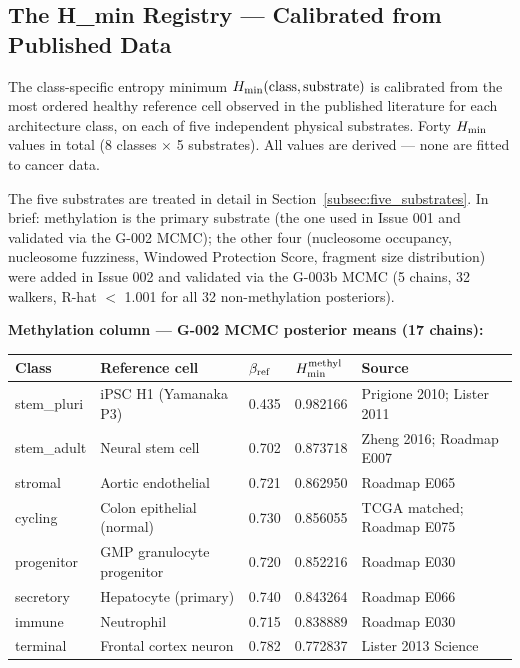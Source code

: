 \documentclass[12pt,a4paper]{article}
\begin{document}

\subsection{The H\_min Registry --- Calibrated from Published Data}
\label{subsec:hmin}

The class-specific entropy minimum $H_{\rm min}(\text{class},\text{substrate})$ is
calibrated from the most ordered healthy reference cell observed in the published
literature for each architecture class, on each of five independent physical
substrates. Forty $H_{\rm min}$ values in total (8 classes $\times$ 5 substrates).
All values are derived --- none are fitted to cancer data.

The five substrates are treated in detail in Section~\ref{subsec:five_substrates}.
In brief: methylation is the primary substrate (the one used in Issue 001 and
validated via the G-002 MCMC); the other four (nucleosome occupancy, nucleosome
fuzziness, Windowed Protection Score, fragment size distribution) were added in
Issue 002 and validated via the G-003b MCMC (5 chains, 32 walkers, R-hat $<$ 1.001
for all 32 non-methylation posteriors).

\textbf{Methylation column --- G-002 MCMC posterior means (17 chains):}

\begin{center}
\renewcommand{\arraystretch}{1.25}
\begin{tabular}{llllp{3.8cm}}
\toprule
\textbf{Class} & \textbf{Reference cell} & \textbf{$\beta_{\rm ref}$} &
\textbf{$H_{\rm min}^{\rm methyl}$} & \textbf{Source} \\
\midrule
stem\_pluri & iPSC H1 (Yamanaka P3) & 0.435 & 0.982166 & Prigione 2010; Lister 2011 \\
stem\_adult & Neural stem cell       & 0.702 & 0.873718 & Zheng 2016; Roadmap E007 \\
stromal     & Aortic endothelial     & 0.721 & 0.862950 & Roadmap E065 \\
cycling     & Colon epithelial (normal) & 0.730 & 0.856055 & TCGA matched; Roadmap E075 \\
progenitor  & GMP granulocyte progenitor & 0.720 & 0.852216 & Roadmap E030 \\
secretory   & Hepatocyte (primary)   & 0.740 & 0.843264 & Roadmap E066 \\
immune      & Neutrophil             & 0.715 & 0.838889 & Roadmap E030 \\
terminal    & Frontal cortex neuron  & 0.782 & 0.772837 & Lister 2013 Science \\
\bottomrule
\end{tabular}
\end{center}
\end{document}

